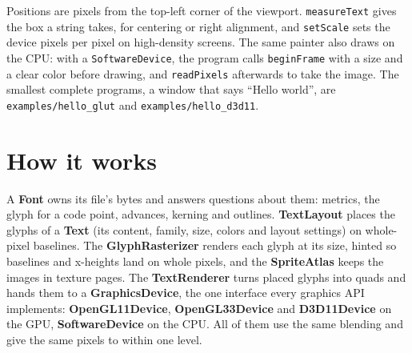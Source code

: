 \documentclass[11pt]{article}
\begin{document}
Positions are pixels from the top-left corner of the viewport. \texttt{measureText} gives the box a string takes, for centering or right alignment, and \texttt{setScale} sets the device pixels per pixel on high-density screens. The same painter also draws on the CPU: with a \texttt{SoftwareDevice}, the program calls \texttt{beginFrame} with a size and a clear color before drawing, and \texttt{readPixels} afterwards to take the image. The smallest complete programs, a window that says ``Hello world'', are \texttt{examples/hello\_glut} and \texttt{examples/hello\_d3d11}.

\section{How it works}

\begin{center}
\end{center}

A \textbf{Font} owns its file's bytes and answers questions about them: metrics, the glyph for a code point, advances, kerning and outlines. \textbf{TextLayout} places the glyphs of a \textbf{Text} (its content, family, size, colors and layout settings) on whole-pixel baselines. The \textbf{GlyphRasterizer} renders each glyph at its size, hinted so baselines and x-heights land on whole pixels, and the \textbf{SpriteAtlas} keeps the images in texture pages. The \textbf{TextRenderer} turns placed glyphs into quads and hands them to a \textbf{GraphicsDevice}, the one interface every graphics API implements: \textbf{OpenGL11Device}, \textbf{OpenGL33Device} and \textbf{D3D11Device} on the GPU, \textbf{SoftwareDevice} on the CPU. All of them use the same blending and give the same pixels to within one level.
\end{document}
